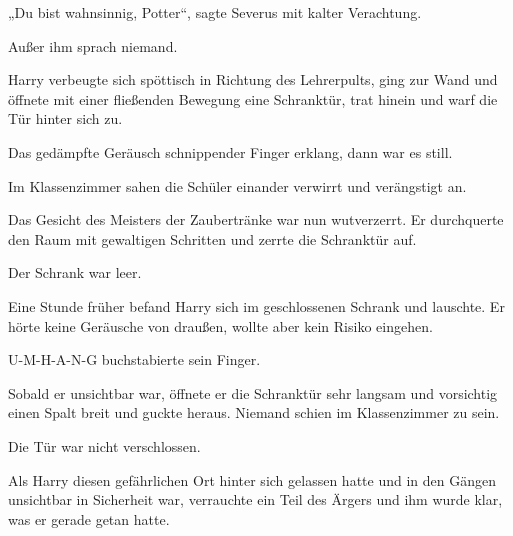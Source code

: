 „Du bist wahnsinnig, Potter“, sagte Severus mit kalter Verachtung.

Außer ihm sprach niemand.

Harry verbeugte sich spöttisch in Richtung des Lehrerpults, ging zur Wand und öffnete mit einer fließenden Bewegung eine Schranktür, trat hinein und warf die Tür hinter sich zu.

Das gedämpfte Geräusch schnippender Finger erklang, dann war es still.

Im Klassenzimmer sahen die Schüler einander verwirrt und verängstigt an.

Das Gesicht des Meisters der Zaubertränke war nun wutverzerrt. Er durchquerte den Raum mit gewaltigen Schritten und zerrte die Schranktür auf.

Der Schrank war leer.

\later

Eine Stunde früher befand Harry sich im geschlossenen Schrank und lauschte. Er hörte keine Geräusche von draußen, wollte aber kein Risiko eingehen.

U-M-H-A-N-G buchstabierte sein Finger.

Sobald er unsichtbar war, öffnete er die Schranktür sehr langsam und vorsichtig einen Spalt breit und guckte heraus. Niemand schien im Klassenzimmer zu sein.

Die Tür war nicht verschlossen.

Als Harry diesen gefährlichen Ort hinter sich gelassen hatte und in den Gängen unsichtbar in Sicherheit war, verrauchte ein Teil des Ärgers und ihm wurde klar, was er gerade getan hatte.

